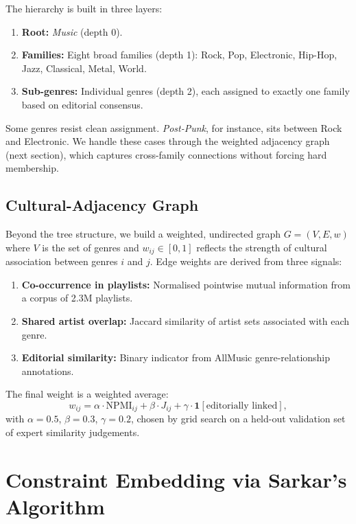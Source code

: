 \documentclass[12pt,a4paper]{article}
\begin{document}
The hierarchy is built in three layers:
\begin{enumerate}
  \item \textbf{Root:} \emph{Music} (depth 0).
  \item \textbf{Families:} Eight broad families (depth 1): Rock, Pop, Electronic, Hip-Hop, Jazz, Classical, Metal, World.
  \item \textbf{Sub-genres:} Individual genres (depth 2), each assigned to exactly one family based on editorial consensus.
\end{enumerate}

Some genres resist clean assignment. \emph{Post-Punk}, for instance, sits between Rock and Electronic. We handle these cases through the weighted adjacency graph (next section), which captures cross-family connections without forcing hard membership.

\subsection{Cultural-Adjacency Graph}

Beyond the tree structure, we build a weighted, undirected graph $G = (V, E, w)$ where $V$ is the set of genres and $w_{ij} \in [0, 1]$ reflects the strength of cultural association between genres $i$ and $j$. Edge weights are derived from three signals:
\begin{enumerate}
  \item \textbf{Co-occurrence in playlists:} Normalised pointwise mutual information from a corpus of 2.3M playlists.
  \item \textbf{Shared artist overlap:} Jaccard similarity of artist sets associated with each genre.
  \item \textbf{Editorial similarity:} Binary indicator from AllMusic genre-relationship annotations.
\end{enumerate}
The final weight is a weighted average:
\begin{equation}
  w_{ij} = \alpha \cdot \mathrm{NPMI}_{ij} + \beta \cdot J_{ij} + \gamma \cdot \mathbf{1}[\text{editorially linked}],
  \label{eq:edge-weight}
\end{equation}
with $\alpha = 0.5$, $\beta = 0.3$, $\gamma = 0.2$, chosen by grid search on a held-out validation set of expert similarity judgements.

\section{Constraint Embedding via Sarkar's Algorithm}
\label{sec:embedding}
\end{document}
